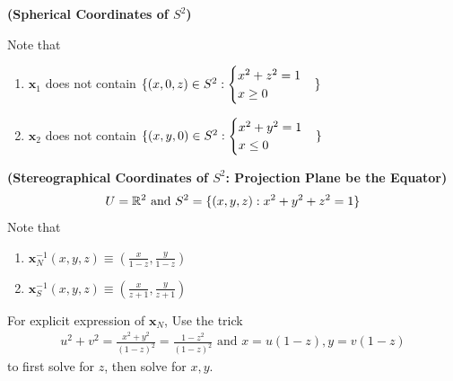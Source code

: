 \documentclass{report}
\begin{document}
\begin{mdframed}
\begin{Example}{\textbf{(Spherical Coordinates of $S^2$)}}{}
\begin{enumerate}[label=(\alph*)]
\end{enumerate}
Note that 
\begin{enumerate}[label=(\alph*)]
  \item $\textbf{x}_1$ does not contain $\{ (x,0,z)\in S^2: \begin{cases}
    x^2+z^2=1\\
    x\geq 0
  \end{cases} \}$ 
\item $\textbf{x}_2$ does not contain $\{ (x,y,0)\in S^2: \begin{cases}
  x^2+y^2=1\\
  x\leq 0
\end{cases} \}$
\end{enumerate}
\end{Example}

\begin{Example}{\textbf{(Stereographical Coordinates of $S^2$: Projection Plane be the Equator)}}{}
\begin{align*}
U=\mathbb{R}^2\text{ and }S^2=\{ (x,y,z):x^2+y^2+z^2=1 \}
\end{align*}
Note that
\begin{enumerate}[label=(\alph*)]
  \item $\textbf{x}_N^{-1}(x,y,z)\equiv (\frac{x}{1-z},\frac{y}{1-z})$ 
  \item $\textbf{x}_S^{-1}(x,y,z)\equiv (\frac{x}{z+1},\frac{y}{z+1}) $
\end{enumerate}
For explicit expression of $\textbf{x}_N$, Use the trick 
\begin{align*}
u^2+v^2=\frac{x^2+y^2}{(1-z)^2}=\frac{1-z^2}{(1-z)^2}\text{ and }x=u(1-z),y=v(1-z)
\end{align*}
to first solve for $z$, then solve for $x,y$.\\


\end{Example}
\end{mdframed}
\end{document}
